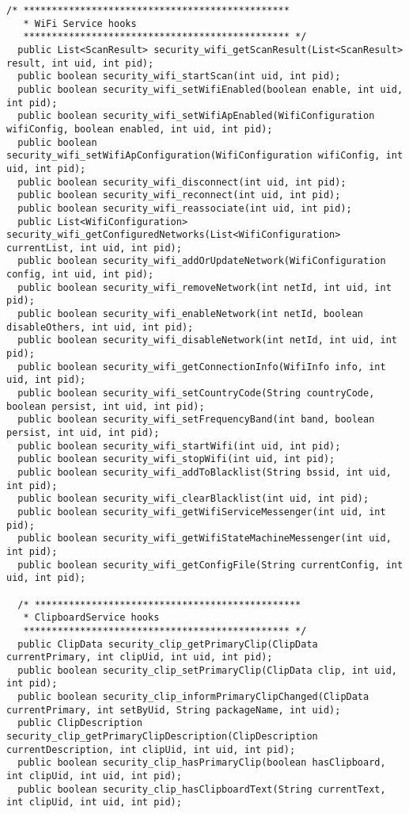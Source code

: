 \documentclass[letterpaper,twocolumn,10pt]{article}
\begin{document}
\begin{lstlisting}[emph={},basicstyle=\footnotesize,caption={Interface for Access Control Policy Modules}]
  /* ***********************************************
   * WiFi Service hooks
   *********************************************** */
  public List<ScanResult> security_wifi_getScanResult(List<ScanResult> result, int uid, int pid);
  public boolean security_wifi_startScan(int uid, int pid);
  public boolean security_wifi_setWifiEnabled(boolean enable, int uid, int pid);
  public boolean security_wifi_setWifiApEnabled(WifiConfiguration wifiConfig, boolean enabled, int uid, int pid);
  public boolean security_wifi_setWifiApConfiguration(WifiConfiguration wifiConfig, int uid, int pid);
  public boolean security_wifi_disconnect(int uid, int pid);
  public boolean security_wifi_reconnect(int uid, int pid);
  public boolean security_wifi_reassociate(int uid, int pid);
  public List<WifiConfiguration> security_wifi_getConfiguredNetworks(List<WifiConfiguration> currentList, int uid, int pid);
  public boolean security_wifi_addOrUpdateNetwork(WifiConfiguration config, int uid, int pid);
  public boolean security_wifi_removeNetwork(int netId, int uid, int pid);
  public boolean security_wifi_enableNetwork(int netId, boolean disableOthers, int uid, int pid);
  public boolean security_wifi_disableNetwork(int netId, int uid, int pid);
  public boolean security_wifi_getConnectionInfo(WifiInfo info, int uid, int pid);
  public boolean security_wifi_setCountryCode(String countryCode, boolean persist, int uid, int pid);
  public boolean security_wifi_setFrequencyBand(int band, boolean persist, int uid, int pid);
  public boolean security_wifi_startWifi(int uid, int pid);
  public boolean security_wifi_stopWifi(int uid, int pid);
  public boolean security_wifi_addToBlacklist(String bssid, int uid, int pid);
  public boolean security_wifi_clearBlacklist(int uid, int pid);
  public boolean security_wifi_getWifiServiceMessenger(int uid, int pid);
  public boolean security_wifi_getWifiStateMachineMessenger(int uid, int pid);
  public boolean security_wifi_getConfigFile(String currentConfig, int uid, int pid);
  
  /* ***********************************************
   * ClipboardService hooks
   *********************************************** */
  public ClipData security_clip_getPrimaryClip(ClipData currentPrimary, int clipUid, int uid, int pid);
  public boolean security_clip_setPrimaryClip(ClipData clip, int uid, int pid);
  public boolean security_clip_informPrimaryClipChanged(ClipData currentPrimary, int setByUid, String packageName, int uid);
  public ClipDescription security_clip_getPrimaryClipDescription(ClipDescription currentDescription, int clipUid, int uid, int pid);
  public boolean security_clip_hasPrimaryClip(boolean hasClipboard, int clipUid, int uid, int pid);
  public boolean security_clip_hasClipboardText(String currentText, int clipUid, int uid, int pid);
  

\end{lstlisting}
\end{document}
